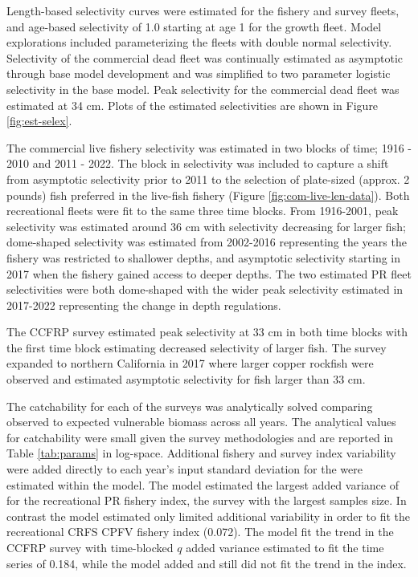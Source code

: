 \documentclass[11pt,
  letterpaper,
]{article}
\begin{document}
Length-based selectivity curves were estimated for the fishery and survey fleets, and age-based selectivity of 1.0 starting at age 1 for the growth fleet. Model explorations included parameterizing the fleets with double normal selectivity. Selectivity of the commercial dead fleet was continually estimated as asymptotic through base model development and was simplified to two parameter logistic selectivity in the base model. Peak selectivity for the commercial dead fleet was estimated at 34 cm. Plots of the estimated selectivities are shown in Figure \ref{fig:est-selex}.

The commercial live fishery selectivity was estimated in two blocks of time; 1916 - 2010 and 2011 - 2022. The block in selectivity was included to capture a shift from asymptotic selectivity prior to 2011 to the selection of plate-sized (approx. 2 pounds) fish preferred in the live-fish fishery (Figure \ref{fig:com-live-len-data}). Both recreational fleets were fit to the same three time blocks. From 1916-2001, peak selectivity was estimated around 36 cm with selectivity decreasing for larger fish; dome-shaped selectivity was estimated from 2002-2016 representing the years the fishery was restricted to shallower depths, and asymptotic selectivity starting in 2017 when the fishery gained access to deeper depths. The two estimated PR fleet selectivities were both dome-shaped with the wider peak selectivity estimated in 2017-2022 representing the change in depth regulations.

The CCFRP survey estimated peak selectivity at 33 cm in both time blocks with the first time block estimating decreased selectivity of larger fish. The survey expanded to northern California in 2017 where larger copper rockfish were observed and estimated asymptotic selectivity for fish larger than 33 cm.

The catchability for each of the surveys was analytically solved comparing observed to expected vulnerable biomass across all years. The analytical values for catchability were small given the survey methodologies and are reported in Table \ref{tab:params} in log-space. Additional fishery and survey index variability were added directly to each year's input standard deviation for the were estimated within the model. The model estimated the largest added variance of for the recreational PR fishery index, the survey with the largest samples size. In contrast the model estimated only limited additional variability in order to fit the recreational CRFS CPFV fishery index (0.072). The model fit the trend in the CCFRP survey with time-blocked \(q\) added variance estimated to fit the time series of 0.184, while the model added and still did not fit the trend in the index.
\end{document}
